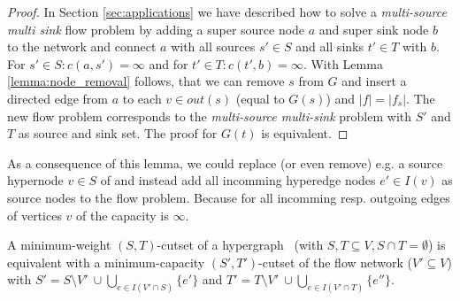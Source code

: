 \begin{proof}
In Section \ref{sec:applications} we have described how to solve a \emph{multi-source 
multi sink} flow problem by adding a super source node $a$ and super sink node $b$ to the network
and connect $a$ with all sources $s' \in S$ and all sinks $t' \in T$ with $b$.
For $s' \in S: c(a,s') = \infty$ and for $t' \in T: c(t',b) = \infty$. With Lemma
\ref{lemma:node_removal} follows, that we can remove $s$ from $G$ and insert
a directed edge from $a$ to each $v \in out(s)$ (equal to $G(s)$) and $|f| = |f_s|$. The new flow problem
corresponds to the \emph{multi-source multi-sink} problem with $S'$ and $T$ as source
and sink set. The proof for $G(t)$ is equivalent.
\end{proof}

As a consequence of this lemma, we could replace (or even remove) 
e.g. a source hypernode $v \in S$ of  and instead add all
incomming hyperedge nodes $e' \in I(v)$ as source nodes to the flow 
problem. Because for all incomming resp. outgoing edges of vertices $v$ of 
 the capacity is $\infty$.

\begin{theorem}
\label{theorem:st_cutset_equal}
A minimum-weight $(S,T)$-cutset of a hypergraph \HypergraphDef~(with $S,T \subseteq V,
S \cap T = \emptyset$) is equivalent with a minimum-capacity $(S',T')$-cutset of the
flow network  ($V' \subseteq V$) with $S' = S \setminus V'\ \cup \bigcup\limits_{e \in I(V' \cap S)} \{e'\}$ and 
$T' = T \setminus V'\ \cup \bigcup\limits_{e \in I(V'\cap T)} \{e''\}$.
\label{theorem:heuer_network}
\end{theorem}

